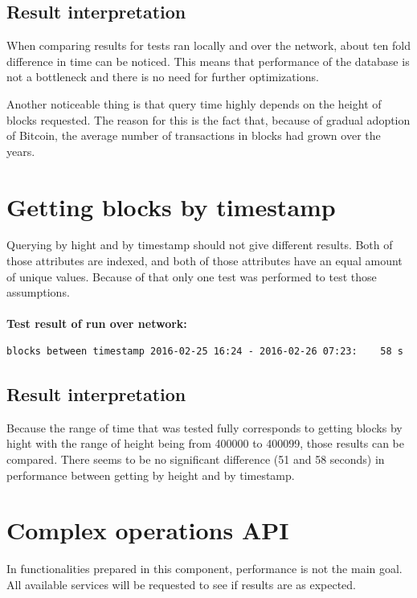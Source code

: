 \documentclass[12pt, en, eng, oneside, final]{mgr}
\begin{document}
\subsection{Result interpretation}
When comparing results for tests ran locally and over the network, about ten fold difference in time can be noticed. This means that performance of the database is not a bottleneck and there is no need for further optimizations.

Another noticeable thing is that query time highly depends on the height of blocks requested. The reason for this is the fact that, because of gradual adoption of Bitcoin, the average number of transactions in blocks had grown over the years. 

\section{Getting blocks by timestamp}
Querying by hight and by timestamp should not give different results. Both of those attributes are indexed, and both of those attributes have an equal amount of unique values. Because of that only one test was performed to test those assumptions.
\\
\\
\textbf{Test result of run over network:}
\begin{verbatim}
blocks between timestamp 2016-02-25 16:24 - 2016-02-26 07:23:    58 s
\end{verbatim}

\subsection{Result interpretation}
Because the range of time that was tested fully corresponds to getting blocks by hight with the range of height being from 400000 to 400099, those results can be compared. There seems to be no significant difference (51 and 58 seconds) in performance between getting by height and by timestamp.

\section{Complex operations API}
In functionalities prepared in this component, performance is not the main goal. All available services will be requested to see if results are as expected.
\end{document}
